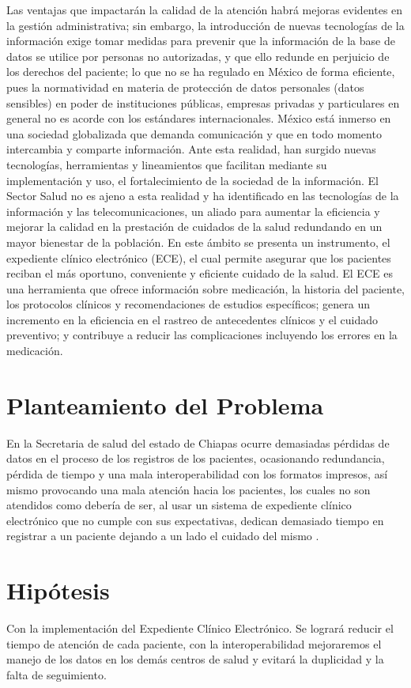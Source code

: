 Las ventajas que impactarán la calidad de la atención habrá mejoras evidentes en la gestión administrativa; sin embargo, la introducción de nuevas tecnologías de la información exige tomar medidas para prevenir que la información de la base de datos se utilice por personas no autorizadas, y que ello redunde en perjuicio de los derechos del paciente; lo que no se ha regulado en México de forma eficiente, pues la normatividad en materia de protección de datos personales (datos sensibles) en poder de instituciones públicas, empresas privadas y particulares en general no es acorde con los estándares internacionales. México está inmerso en una sociedad globalizada que demanda comunicación y que en todo momento intercambia y comparte información. Ante esta realidad, han surgido nuevas tecnologías, herramientas y lineamientos que facilitan mediante su implementación y uso, el fortalecimiento de la sociedad de la información. El Sector Salud no es ajeno a esta realidad y ha identificado en las tecnologías de la información y las telecomunicaciones, un aliado para aumentar la eficiencia y mejorar la calidad en la prestación de cuidados de la salud redundando en un mayor bienestar de la población. En este ámbito se presenta un instrumento, el expediente clínico electrónico (ECE), el cual permite asegurar que los pacientes reciban el más oportuno, conveniente y eficiente cuidado de la salud. El ECE es una herramienta que ofrece información sobre medicación, la historia del paciente, los protocolos clínicos y recomendaciones de estudios específicos; genera un incremento en la eficiencia en el rastreo de antecedentes clínicos y el cuidado preventivo; y contribuye a reducir las complicaciones incluyendo los errores en la medicación.


\section{Planteamiento del Problema}
En la Secretaria de salud del estado de Chiapas ocurre demasiadas pérdidas de datos en el proceso de los registros de los pacientes, ocasionando redundancia, pérdida de tiempo y una mala interoperabilidad con los formatos impresos, así mismo provocando una mala atención hacia los pacientes, los cuales no son atendidos como debería de ser, al usar un sistema de expediente clínico electrónico que no cumple con sus expectativas, dedican demasiado tiempo en registrar a un paciente dejando a un  lado el cuidado del mismo .

\section{Hipótesis}
Con la implementación del Expediente Clínico Electrónico. Se logrará reducir el tiempo de atención de cada paciente, con la interoperabilidad mejoraremos el manejo de los datos en los demás centros de salud y evitará la duplicidad y la falta de seguimiento.

